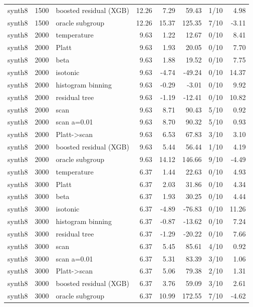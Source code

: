 \begin{tabular}{lllrrrlr}
synth8 & 1500 & boosted residual (XGB) & 12.26 & 7.29 & 59.43 & 1/10 & 4.98 \\
synth8 & 1500 & oracle subgroup & 12.26 & 15.37 & 125.35 & 7/10 & -3.11 \\
synth8 & 2000 & temperature & 9.63 & 1.22 & 12.67 & 0/10 & 8.41 \\
synth8 & 2000 & Platt & 9.63 & 1.93 & 20.05 & 0/10 & 7.70 \\
synth8 & 2000 & beta & 9.63 & 1.88 & 19.52 & 0/10 & 7.75 \\
synth8 & 2000 & isotonic & 9.63 & -4.74 & -49.24 & 0/10 & 14.37 \\
synth8 & 2000 & histogram binning & 9.63 & -0.29 & -3.01 & 0/10 & 9.92 \\
synth8 & 2000 & residual tree & 9.63 & -1.19 & -12.41 & 0/10 & 10.82 \\
synth8 & 2000 & scan & 9.63 & 8.71 & 90.43 & 5/10 & 0.92 \\
synth8 & 2000 & scan a=0.01 & 9.63 & 8.70 & 90.32 & 5/10 & 0.93 \\
synth8 & 2000 & Platt->scan & 9.63 & 6.53 & 67.83 & 3/10 & 3.10 \\
synth8 & 2000 & boosted residual (XGB) & 9.63 & 5.44 & 56.44 & 1/10 & 4.19 \\
synth8 & 2000 & oracle subgroup & 9.63 & 14.12 & 146.66 & 9/10 & -4.49 \\
synth8 & 3000 & temperature & 6.37 & 1.44 & 22.63 & 0/10 & 4.93 \\
synth8 & 3000 & Platt & 6.37 & 2.03 & 31.86 & 0/10 & 4.34 \\
synth8 & 3000 & beta & 6.37 & 1.93 & 30.25 & 0/10 & 4.44 \\
synth8 & 3000 & isotonic & 6.37 & -4.89 & -76.83 & 0/10 & 11.26 \\
synth8 & 3000 & histogram binning & 6.37 & -0.87 & -13.62 & 0/10 & 7.24 \\
synth8 & 3000 & residual tree & 6.37 & -1.29 & -20.22 & 0/10 & 7.66 \\
synth8 & 3000 & scan & 6.37 & 5.45 & 85.61 & 4/10 & 0.92 \\
synth8 & 3000 & scan a=0.01 & 6.37 & 5.31 & 83.39 & 3/10 & 1.06 \\
synth8 & 3000 & Platt->scan & 6.37 & 5.06 & 79.38 & 2/10 & 1.31 \\
synth8 & 3000 & boosted residual (XGB) & 6.37 & 3.76 & 59.09 & 3/10 & 2.61 \\
synth8 & 3000 & oracle subgroup & 6.37 & 10.99 & 172.55 & 7/10 & -4.62 \\

\end{tabular}
